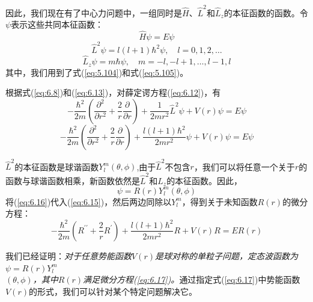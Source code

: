     因此，我们现在有了中心力问题中，一组同时是$\hat{H}$、$\hat{L}^2$和$\hat{L}_z$的本征函数的函数。令$\psi$表示这些共同本征函数：
    \begin{equation}
        \boxed{
            \hat{H}\psi = E\psi
        }
        \label{eq:6.12}
    \end{equation}
    \begin{equation}
        \boxed{
            \hat{L}^2\psi = l\left(l+1\right)\hbar^2\psi, \quad l = 0, 1, 2, \ldots
        }
        \label{eq:6.13}
    \end{equation}
    \begin{equation}
        \boxed{
            \hat{L}_z\psi = m\hbar\psi, \quad m = -l, -l+1, \ldots, l-1, l
        }
        \label{eq:6.14}
    \end{equation}
    其中，我们用到了式(\ref{eq:5.104})和式(\ref{eq:5.105})。

    根据式(\ref{eq:6.8})和(\ref{eq:6.13})，对薛定谔方程(\ref{eq:6.12})，有
    \begin{equation*}
        -\frac{\hbar^2}{2m}\left(\frac{\partial^2}{\partial r^2} + \frac{2}{r}\frac{\partial}{\partial r}\right) + \frac{1}{2mr^2}\hat{L}^2\psi + V\left(r\right)\psi = E\psi
    \end{equation*}
    \begin{equation}
        -\frac{\hbar^2}{2m}\left(\frac{\partial^2}{\partial r^2} + \frac{2}{r}\frac{\partial}{\partial r}\right) + \frac{l\left(l+1\right)\hbar^2}{2mr^2}\psi + V\left(r\right)\psi = E\psi
        \label{eq:6.15}
    \end{equation}

    $\hat{L}^2$的本征函数是球谐函数$Y_l^m\left(\theta, \phi\right)$,由于$\hat{L}^2$不包含$r$，我们可以将任意一个关于$r$的函数与球谐函数相乘，新函数依然是$\hat{L}^2$和$\hat{L}_z$的本征函数。因此，
    \begin{equation}
        \boxed{
            \psi = R\left(r\right)Y_l^m\left(\theta, \phi\right)
        }
        \label{eq:6.16}
    \end{equation}
    将(\ref{eq:6.16})代入(\ref{eq:6.15})，然后两边同除以$Y_l^m$，得到关于未知函数$R\left(r\right)$的微分方程：
    \begin{equation}
        -\frac{\hbar^2}{2m}\left(R^{\prime\prime}+ \frac{2}{r}R^{\prime}\right) + \frac{l\left(l+1\right)\hbar^2}{2mr^2}R + V\left(r\right)R = ER\left(r\right)
        \label{eq:6.17}
    \end{equation}

    我们已经证明：\textit{对于任意势能函数$V\left(r\right)$是球对称的单粒子问题，定态波函数为$\psi = R\left(r\right)Y_l^m$\\$\left(\theta, \phi\right)$，其中$R\left(r\right)$满足微分方程(\ref{eq:6.17})。}通过指定式(\ref{eq:6.17})中势能函数$V\left(r\right)$的形式，我们可以针对某个特定问题解决它。

